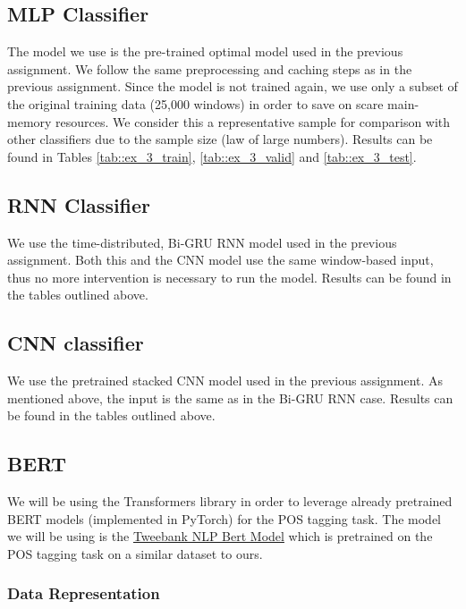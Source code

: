 \documentclass[10pt, a4paper]{article}
\begin{document}
	
	\subsection{MLP Classifier}
	
	The model we use is the pre-trained optimal model used in the previous assignment. We follow the same preprocessing and caching steps as in the previous assignment. Since the model is not trained again, we use only a subset of the original training data (25,000 windows) in order to save on scare main-memory resources. We consider this a representative sample for comparison with other classifiers due to the sample size (law of large numbers). Results can be found in Tables \ref{tab::ex_3_train}, \ref{tab::ex_3_valid} and \ref{tab::ex_3_test}.
	
	
	\subsection{RNN Classifier}
	
	We use the time-distributed, Bi-GRU RNN model used in the previous assignment. Both this and the CNN model use the same window-based input, thus no more intervention is necessary to run the model. Results can be found in the tables outlined above.
	
	
	\subsection{CNN classifier}
	
	We use the pretrained stacked CNN model used in the previous assignment. As mentioned above, the input is the same as in the Bi-GRU RNN case. Results can be found in the tables outlined above.
	
	
	
	\subsection{BERT}
	
	We will be using the Transformers library in order to leverage already pretrained BERT models (implemented in PyTorch) for the POS tagging task. The model we will be using is the \href{https://huggingface.co/TweebankNLP/bertweet-tb2_ewt-pos-tagging}{Tweebank NLP Bert Model} which is pretrained on the POS tagging task on a similar dataset to ours.
	
	
	\subsubsection{Data Representation}
	
\end{document}

